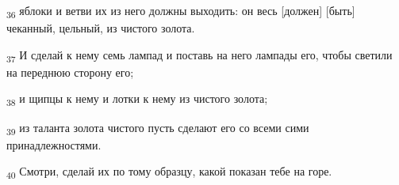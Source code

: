 \begin{tcolorbox}
\textsubscript{36} яблоки и ветви их из него должны выходить: он весь [должен] [быть] чеканный, цельный, из чистого золота.
\end{tcolorbox}
\begin{tcolorbox}
\textsubscript{37} И сделай к нему семь лампад и поставь на него лампады его, чтобы светили на переднюю сторону его;
\end{tcolorbox}
\begin{tcolorbox}
\textsubscript{38} и щипцы к нему и лотки к нему из чистого золота;
\end{tcolorbox}
\begin{tcolorbox}
\textsubscript{39} из таланта золота чистого пусть сделают его со всеми сими принадлежностями.
\end{tcolorbox}
\begin{tcolorbox}
\textsubscript{40} Смотри, сделай их по тому образцу, какой показан тебе на горе.
\end{tcolorbox}
